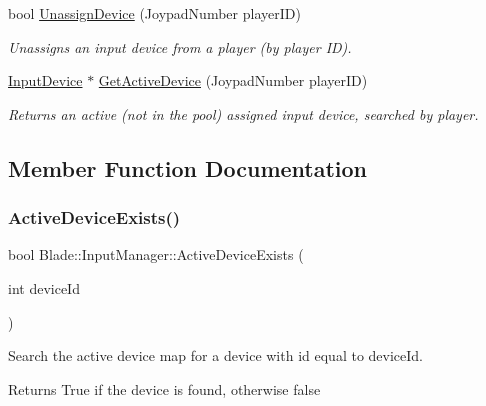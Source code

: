 \begin{DoxyCompactItemize}
bool \hyperlink{class_blade_1_1_input_manager_a13f1624084d79930b4ad6c6615277a5b}{Unassign\+Device} (Joypad\+Number player\+ID)
\begin{DoxyCompactList}\small\item\em Unassigns an input device from a player (by player ID). \end{DoxyCompactList}\item 
\hyperlink{class_blade_1_1_input_device}{Input\+Device} $\ast$ \hyperlink{class_blade_1_1_input_manager_a8b5863fec63f8e322476cd1a4a4292dc}{Get\+Active\+Device} (Joypad\+Number player\+ID)
\begin{DoxyCompactList}\small\item\em Returns an active (not in the pool) assigned input device, searched by player. \end{DoxyCompactList}\end{DoxyCompactItemize}


\subsection{Member Function Documentation}
\mbox{\label{class_blade_1_1_input_manager_a6aadb5a4fd8ccfe2de69c1f2d62df37d}} 
\subsubsection{\texorpdfstring{Active\+Device\+Exists()}{ActiveDeviceExists()}}
{\footnotesize\ttfamily bool Blade\+::\+Input\+Manager\+::\+Active\+Device\+Exists (\begin{DoxyParamCaption}\item[{int}]{device\+Id }\end{DoxyParamCaption})}



Search the active device map for a device with id equal to device\+Id. 

\begin{DoxyReturn}{Returns}
True if the device is found, otherwise false 
\end{DoxyReturn}
\mbox{\label{class_blade_1_1_input_manager_a1c7e8d968e53123e3077c2386eaac7ae}} 
